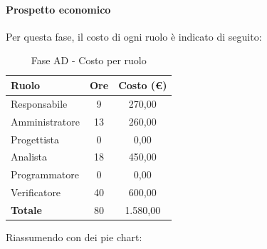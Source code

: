 \documentclass[../PianoProgetto.tex]{subfiles}
\begin{document}
\vfill
	
	\paragraph{Prospetto economico}
					Per questa fase\g, il costo di ogni ruolo è indicato di seguito:
					\begin{table}[h]
		\centering
	
		\begin{tabular}{l * {2}{c}}
			\toprule
			\textbf{Ruolo} & \textbf{Ore} & \textbf{Costo (\euro{})} \\
			\midrule
			Responsabile &	9 & 270,00 \\
			Amministratore & 13 & 260,00 \\
			Progettista & 0 & 0,00 \\
			Analista & 18 & 450,00 \\
			Programmatore & 0 & 0,00 \\
			Verificatore & 40 & 600,00 \\
			\midrule		
			\textbf{Totale} & 80 & 1.580,00 \\
			\bottomrule
		\end{tabular}
		\caption{Fase AD - Costo per ruolo}
		\label{tab:faseAD_costo}
	\end{table}
\vfill
\newpage
	
	Riassumendo con dei pie chart:
\end{document}
